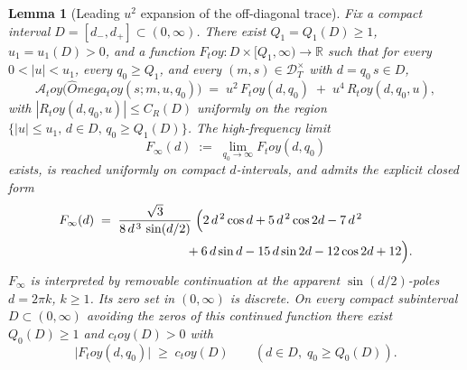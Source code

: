 \documentclass[11pt,a4paper]{amsart}
\def\Omega{Omega}%
\def\toy{toy}%
\numberwithin{equation}{section}
\theoremstyle{plain}
\newtheorem{lemma}[theorem]{Lemma}
\theoremstyle{definition}
\newcommand{\Om}{\Omega}
\newcommand{\toy}{\mathrm{toy}}
\begin{document}
\begin{lemma}[Leading \(u^2\) expansion of the off-diagonal trace]
\label{lem:toy-anomaly-leading}
Fix a compact interval \(D=[d_-,d_+]\subset(0,\infty)\).  There exist
\(Q_1=Q_1(D)\ge1\), \(u_1=u_1(D)>0\), and a function
\(F_\toy:D\times[Q_1,\infty)\to\mathbb R\) such that for every
\(0<|u|<u_1\), every \(q_0\ge Q_1\), and every
\((m,s)\in\mathcal D_T^\times\) with \(d=q_0\,s\in D\),
\begin{equation}
\label{eq:toy-anomaly-leading}
\mathcal A_\toy\bigl(\widehat\Om_\toy(s;m,u,q_0)\bigr)
\;=\;u^2\,F_\toy(d,q_0)\;+\;u^4\,R_\toy(d,q_0,u),
\end{equation}
with \(|R_\toy(d,q_0,u)|\le C_R(D)\) uniformly on the region
\(\{|u|\le u_1,\,d\in D,\,q_0\ge Q_1(D)\}\).  The high-frequency limit
\begin{equation}
\label{eq:F-toy-asymptotic}
        F_{\infty}(d)\;:=\;\lim_{q_0\to\infty}F_\toy(d,q_0)
\end{equation}
exists, is reached uniformly on compact \(d\)-intervals, and admits
the explicit closed form
\begin{equation}
\label{eq:F-toy-closed-form}
\begin{aligned}
F_{\infty}(d)
\;&=\;\frac{\sqrt 3}{8\,d^{\,3}\,\sin(d/2)}\;\Bigl(
2\,d^{\,2}\cos d+5\,d^{\,2}\cos 2d-7\,d^{\,2}\\
&\qquad\qquad\qquad\quad
+6\,d\sin d-15\,d\sin 2d-12\cos 2d+12\Bigr).
\end{aligned}
\end{equation}
\(F_{\infty}\) is interpreted by removable continuation at the
apparent \(\sin(d/2)\)-poles \(d=2\pi k\), \(k\ge1\).  Its zero set in
\((0,\infty)\) is discrete.  On every compact subinterval
\(D\subset(0,\infty)\) avoiding the zeros of this continued function
there exist \(Q_0(D)\ge 1\) and
\(c_\toy(D)>0\) with
\begin{equation}
\label{eq:F-toy-lower-bound}
        \bigl|F_\toy(d,q_0)\bigr|\;\ge\;c_\toy(D)
        \qquad (d\in D,\;q_0\ge Q_0(D)).
\end{equation}
\end{lemma}
\end{document}
